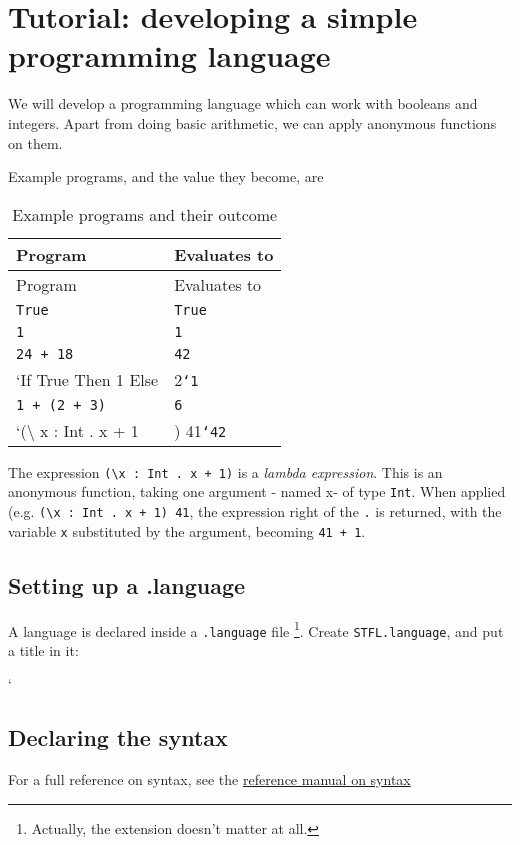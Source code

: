 \section{Tutorial: developing a simple programming
language}\label{tutorial-developing-a-simple-programming-language}

We will develop a programming language which can work with booleans and
integers. Apart from doing basic arithmetic, we can apply anonymous
functions on them.

Example programs, and the value they become, are

\begin{longtable}[c]{@{}ll@{}}
\caption{Example programs and their outcome}\tabularnewline
\toprule
Program & Evaluates to\tabularnewline
\midrule
\endfirsthead
\toprule
Program & Evaluates to\tabularnewline
\midrule
\endhead
\texttt{True} & \texttt{True}\tabularnewline
\texttt{1} & \texttt{1}\tabularnewline
\texttt{24\ +\ 18} & \texttt{42}\tabularnewline
`If True Then 1 Else & 2\texttt{`1}\tabularnewline
\texttt{1\ +\ (2\ +\ 3)} & \texttt{6}\tabularnewline
`(\textbackslash{} x : Int . x + 1 & ) 41\texttt{`42}\tabularnewline
\bottomrule
\end{longtable}

The expression \texttt{(\textbackslash{}x\ :\ Int\ .\ x\ +\ 1)} is a
\emph{lambda expression}. This is an anonymous function, taking one
argument - named x- of type \texttt{Int}. When applied (e.g.
\texttt{(\textbackslash{}x\ :\ Int\ .\ x\ +\ 1)\ 41}, the expression
right of the \texttt{.} is returned, with the variable \texttt{x}
substituted by the argument, becoming \texttt{41\ +\ 1}.

\subsection{Setting up a .language}\label{setting-up-a-.language}

A language is declared inside a \texttt{.language} file \footnote{Actually,
  the extension doesn't matter at all.}. Create \texttt{STFL.language},
and put a title in it:

`

\subsection{Declaring the syntax}\label{declaring-the-syntax}

For a full reference on syntax, see the
\protect\hyperlink{syntax}{reference manual on syntax}

